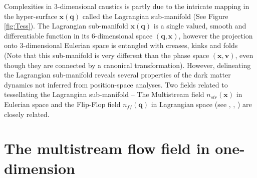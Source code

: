  
Complexities in 3-dimensional caustics is partly due to the intricate mapping in the hyper-surface $\mathbf{x}(\mathbf{q})$ called the Lagrangian sub-manifold (See Figure \ref{fig:Tess}). The Lagrangian sub-manifold $\mathbf{x}(\mathbf{q})$  is a single valued, smooth and differentiable function in its 6-dimensional space $(\mathbf{q}, \mathbf{x})$, however the projection onto 3-dimensional Eulerian space is entangled with creases, kinks and folds (Note that this  sub-manifold is very different than the phase space $(\mathbf{x},\mathbf{v})$, even though they are connected by a canonical transformation). However, delineating the Lagrangian sub-manifold reveals several properties of the dark matter dynamics not inferred from position-space analyses. Two fields related to tessellating the Lagrangian sub-manifold -- The Multistream field $n_{str}(\mathbf{x})$ in Eulerian space and the Flip-Flop field $n_{ff}(\mathbf{q})$ in Lagrangian space (see \cite{Shandarin2012}, \cite{Ramachandra2015}, \cite{Shandarin2016}) are closely related. 





\section{The multistream flow field in one-dimension}
\label{appendix:nstream}

